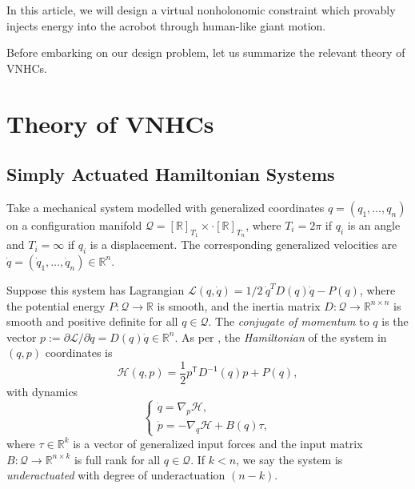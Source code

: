 \documentclass[journal,twoside,web]{ieeecolor}
\newcommand*{\tpose}{^\mathsf{T}}
\newcommand*{\inv}{^\mathsf{-1}}
\newcommand*{\Rt}[1]{[\R]_{#1}}
\newcommand*{\R}{\mathbb{R}}
\begin{document}
In this article, we will design a virtual
nonholonomic constraint which provably injects energy into the acrobot through 
human-like giant motion.

Before embarking on our design problem, let us summarize the relevant theory of
VNHCs.

\section{Theory of VNHCs}\label{sec:vnhc}

\subsection{Simply Actuated Hamiltonian Systems}
Take a mechanical system modelled with generalized coordinates 
\(q = (q_1, \ldots, q_n)\) on a configuration manifold
\(\mathcal{Q} = \Rt{T_1} \times \cdot \Rt{T_n}\), where
\(T_i = 2\pi\) if \(q_i\) is an angle and \(T_i = \infty\) if \(q_i\) is a
displacement. The corresponding generalized velocities are 
\(\dot{q} = (\dot{q}_1,\ldots,\dot{q}_n) \in \R^n\).

Suppose this system has Lagrangian
\(\mathcal{L}(q,\dot{q}) = 1/2~\dot{q}^T D(q) \dot{q} - P(q)\),
where the potential energy 
\(P : \mathcal{Q} \rightarrow \mathbb{R}\) 
is smooth, and the inertia matrix 
\(D : \mathcal{Q} \rightarrow \mathbb{R}^{n \times n}\)
is smooth and positive definite for all \(q \in \mathcal{Q}\).
The \textit{conjugate of momentum} to \(q\) is the vector
\(p := \partial\mathcal{L}/\partial\dot{q} = D(q) \dot{q} \in \R^n\).
As per \cite{landau_mechanics}, 
the \textit{Hamiltonian} of the system in \((q,p)\) coordinates
is
\begin{equation}\label{eqn:hamiltonian}
    \mathcal{H}(q,p) = \frac{1}{2} p\tpose D\inv(q) p + P(q)
    ,
\end{equation}
with dynamics
\begin{equation}\label{eqn:hamiltonian-eom-general}
    \begin{cases}
        \dot{q} = \nabla_p\mathcal{H} 
        , \\
        \dot{p} = -\nabla_q\mathcal{H} + B(q) \tau
        ,
    \end{cases}
\end{equation}
where \(\tau \in \R^k\) is a vector of generalized input forces and the input
matrix \(B : \mathcal{Q} \rightarrow \R^{n \times k}\) is full rank for all 
\(q \in \mathcal{Q}\).
If \(k < n\), we say the system is \textit{underactuated} with degree of
underactuation \((n-k)\).
\end{document}
